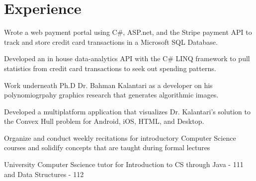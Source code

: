 \documentclass[]{deedy-resume-openfont}
\begin{document}
\hfill
\begin{minipage}[t]{0.66\textwidth} 


\section{Experience}

\vspace{\topsep} 
\begin{tightemize}
\item Wrote a web payment portal using C\#, ASP.net, and the Stripe payment API to track and store credit card transactions in a Microsoft SQL Database.
\item Developed an in house data-analytics API with the C\# LINQ framework to pull statistics from credit card transactions to seek out spending patterns. 
\end{tightemize}
\sectionsep

\begin{tightemize}
\item Work underneath Ph.D Dr. Bahman Kalantari as a developer on his polynomiogrpahy graphics research that generates algorithmic images.  
\item Developed a multiplatform application that visualizes Dr. Kalantari's solution to the Convex Hull problem for Android, iOS, HTML, and Desktop. 
\end{tightemize}
\sectionsep

\begin{tightemize}
\item Organize and conduct weekly recitations for introductory Computer Science courses and solidify concepts that are taught during formal lectures
\item University Computer Sscience tutor for Introduction to CS through Java - 111 and Data Structures - 112
\end{tightemize}
\sectionsep


\end{minipage}
\end{document}
